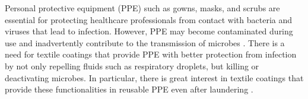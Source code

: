 \documentclass[journal=jacsat,manuscript=article]{achemso}
\begin{document}



Personal protective equipment (PPE) such as  gowns,  masks, and scrubs are essential for protecting healthcare professionals from contact with bacteria and viruses that lead to infection.
However, PPE may become contaminated during use and inadvertently contribute to the transmission of microbes \cite{Sakaguchi:10}. There is a need for textile coatings that provide PPE with better protection from infection 
by not only repelling fluids such as 
respiratory droplets, but 
killing or deactivating microbes. In particular, there is great interest in textile coatings that provide these functionalities in reusable PPE even after laundering \cite{Kraay:18}.
\end{document}
